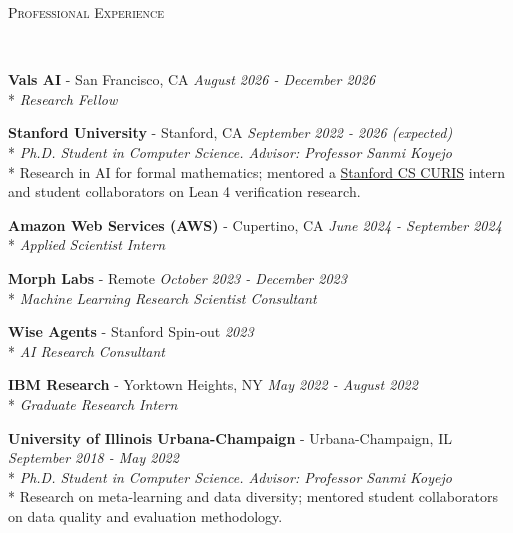 \documentclass{article}
\newenvironment{changemargin}[2]{%
  \begin{list}{}{%
    \setlength{\topsep}{0pt}%
    \setlength{\leftmargin}{#1}%
    \setlength{\rightmargin}{#2}%
    \setlength{\listparindent}{\parindent}%
    \setlength{\itemindent}{\parindent}%
    \setlength{\parsep}{\parskip}%
  }%
  \item[]}{\end{list}
}
\newcommand{\lineover}{
	\begin{changemargin}{-0.05in}{-0.05in}
		\vspace*{-8pt}
		\hrulefill \\
		\vspace*{-2pt}
	\end{changemargin}
}
\newcommand{\header}[1]{
	\begin{changemargin}{-0.5in}{-0.5in}
		\scshape{#1}\\
  	\lineover
	\end{changemargin}
	\nopagebreak[4]    %
}
\newenvironment{body} {
		\vspace*{-16pt}
		\begin{changemargin}{-0.25in}{-0.5in}
	  }
		{\end{changemargin}\vspace{8pt plus 12pt}
	}
\begin{document}
\header{Professional Experience}

\begin{body}
	\vspace{12pt}

	\textbf{Vals AI} - San Francisco, CA \hfill \emph{August 2026 - December 2026}\\*
	\emph{Research Fellow}\\
	\vspace{8pt}

    \textbf{Stanford University} - Stanford, CA \hfill \emph{September 2022 - 2026 (expected)}\\*
	\emph{Ph.D. Student in Computer Science. Advisor: Professor Sanmi Koyejo}\\*
	Research in AI for formal mathematics; mentored a \href{https://www.cs.stanford.edu/bachelors/research-opportunities}{Stanford CS CURIS} intern and student collaborators on Lean 4 verification research.\\
	\vspace{8pt}

    \textbf{Amazon Web Services (AWS)} - Cupertino, CA \hfill \emph{June 2024 - September 2024}\\*
	\emph{Applied Scientist Intern}\\
	\vspace{8pt}

    \textbf{Morph Labs} - Remote \hfill \emph{October 2023 - December 2023}\\*
	\emph{Machine Learning Research Scientist Consultant}\\
	\vspace{8pt}

	\textbf{Wise Agents} - Stanford Spin-out \hfill \emph{2023}\\*
	\emph{AI Research Consultant}\\
	\vspace{8pt}

	\textbf{IBM Research} - Yorktown Heights, NY \hfill \emph{May 2022 - August 2022}\\*
	\emph{Graduate Research Intern}\\
	\vspace{8pt}

	\textbf{University of Illinois Urbana-Champaign} - Urbana-Champaign, IL \hfill \emph{September 2018 - May 2022}\\*
	\emph{Ph.D. Student in Computer Science. Advisor: Professor Sanmi Koyejo}\\*
	Research on meta-learning and data diversity; mentored student collaborators on data quality and evaluation methodology.\\
	\vspace{8pt}


\end{body}
\end{document}
